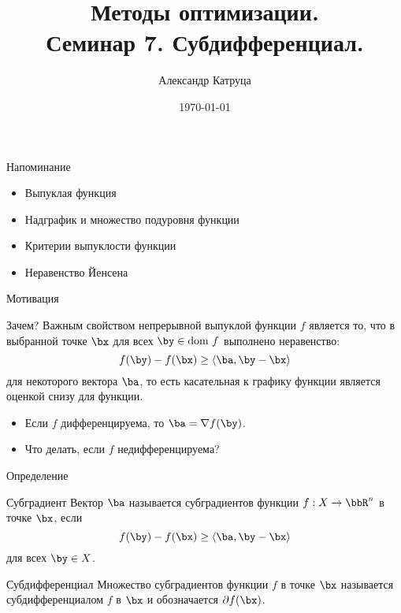 \documentclass[12pt]{beamer}
\title[Семинар 7]{Методы оптимизации. \\
 Семинар 7. Субдифференциал.}
\author{Александр Катруца}
\institute{Московский физико-технический институт,\\
Факультет Управления и Прикладной Математики}
\date{\today}
\begin{document}
\begin{frame}
\maketitle
\end{frame}

\begin{frame}{Напоминание}
\begin{itemize}
\item Выпуклая функция
\item Надграфик и множество подуровня функции
\item Критерии выпуклости функции
\item Неравенство Йенсена
\end{itemize}
\end{frame}

\begin{frame}{Мотивация}
\begin{block}{Зачем?}
Важным свойством непрерывной выпуклой функции $f$ является то, что в выбранной точке $\bx$ для всех $\by \in \text{dom } f$ выполнено неравенство:
\vspace{-3mm} 
\[
f(\by) - f(\bx) \geq \langle \ba, \by - \bx \rangle
\vspace{-4mm}
\]
для некоторого вектора $\ba$, то есть касательная к графику функции является {\color{red}{глобальной}} оценкой снизу для функции. 
\end{block}

\begin{itemize}
\item Если $f$ дифференцируема, то $\ba = \nabla f(\by)$.
\item Что делать, если $f$ недифференцируема?
\end{itemize}

\end{frame}

\begin{frame}{Определение}
\begin{block}{Субградиент}
Вектор $\ba$ называется субградиентов функции $f: X \rightarrow \bbR^n$ в точке $\bx$, если 
\vspace{-3mm}
\[
f(\by) - f(\bx) \geq \langle \ba, \by - \bx \rangle
\]
для всех $\by \in X$.
\end{block}

\begin{block}{Субдифференциал}
Множество субградиентов функции $f$ в точке $\bx$ называется субдифференциалом $f$ в $\bx$ и обозначается $\partial f(\bx)$.
\end{block}
\end{frame}
\end{document}
